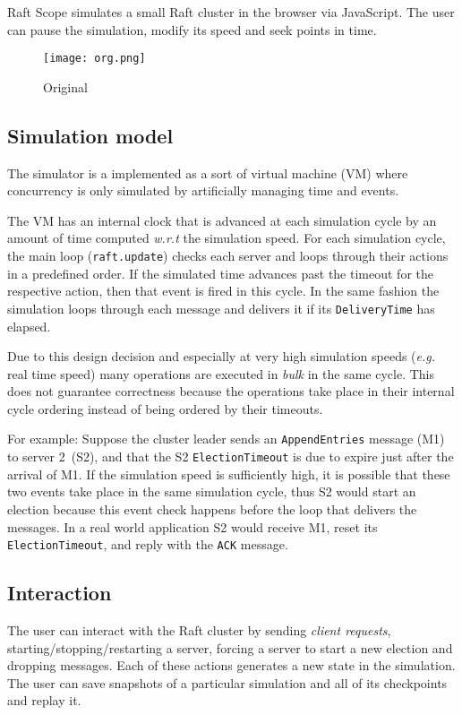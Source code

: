 Raft Scope simulates a small Raft cluster in the browser via JavaScript.
The user can pause the simulation, modify its speed and seek points in time.

\begin{figure}[h]
    \centering
    \texttt{[image: org.png]}
    \caption{Original}\label{fig:original}
\end{figure}

\subsection{Simulation model}\label{sec:simulation}
The simulator is a implemented as a sort of virtual machine (VM) where
concurrency is only simulated by artificially managing time and events.

The VM has an internal clock that is advanced at each simulation cycle
by an amount of time computed \textit{w.r.t} the simulation speed.
For each simulation cycle, the main loop (\texttt{raft.update}) checks each server and loops through their
actions in a predefined order. If the simulated time advances past the timeout for the respective action, then
that event is fired in this cycle. In the same fashion the simulation loops through each message and delivers it if its
\texttt{DeliveryTime} has elapsed.

Due to this design decision and especially at very high simulation speeds (\textit{e.g.} real time speed)
many operations are executed in \emph{bulk} in the same cycle.
This does not guarantee correctness because the operations take place in their internal cycle ordering instead of
being ordered by their timeouts.

For example:
Suppose the cluster leader sends an \texttt{AppendEntries} message (M1)
to server 2~(S2), and that the S2 \texttt{ElectionTimeout} is due to expire just after
the arrival of M1. If the simulation speed is sufficiently high, it is possible that these two events
take place in the same simulation cycle, thus S2 would start an election because this event check happens before the
loop that delivers the messages.
In a real world application S2 would receive M1, reset its \texttt{ElectionTimeout}, and reply with the \texttt{ACK} message.

\subsection{Interaction}
The user can interact with the Raft cluster by sending \emph{client requests}, starting/stopping/restarting a server,
forcing a server to start a new election and dropping messages.
Each of these actions generates a new state in the simulation.
The user can save snapshots of a particular simulation and all of its checkpoints and replay it.

